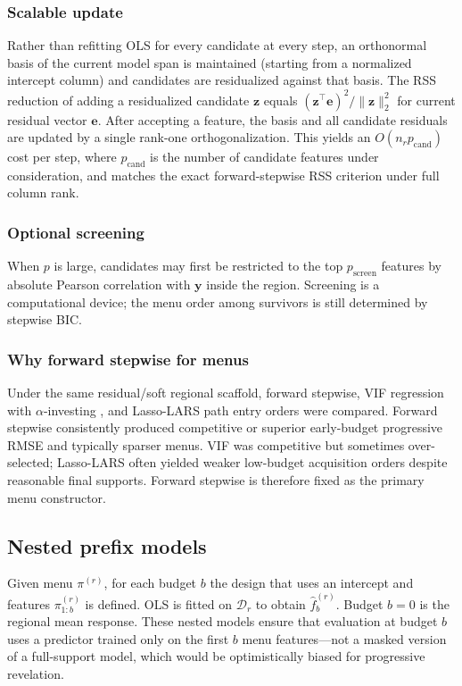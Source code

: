 \documentclass[pdflatex,sn-basic,Numbered]{sn-jnl}
\begin{document}
\subsubsection{Scalable update}
Rather than refitting OLS for every candidate at every step, an orthonormal basis of the current model span is maintained (starting from a normalized intercept column) and candidates are residualized against that basis. The RSS reduction of adding a residualized candidate \(\mathbf{z}\) equals \((\mathbf{z}^\top \mathbf{e})^2/\|\mathbf{z}\|_2^2\) for current residual vector \(\mathbf{e}\). After accepting a feature, the basis and all candidate residuals are updated by a single rank-one orthogonalization. This yields an \(O(n_r p_{\mathrm{cand}})\) cost per step, where \(p_{\mathrm{cand}}\) is the number of candidate features under consideration, and matches the exact forward-stepwise RSS criterion under full column rank.

\subsubsection{Optional screening}
When \(p\) is large, candidates may first be restricted to the top \(p_{\mathrm{screen}}\) features by absolute Pearson correlation with \(\mathbf{y}\) inside the region. Screening is a computational device; the menu order among survivors is still determined by stepwise BIC.

\subsubsection{Why forward stepwise for menus}
Under the same residual/soft regional scaffold, forward stepwise, VIF regression with \(\alpha\)-investing \cite{lin2011}, and Lasso-LARS path entry orders \cite{efron2004} were compared. Forward stepwise consistently produced competitive or superior early-budget progressive RMSE and typically sparser menus. VIF was competitive but sometimes over-selected; Lasso-LARS often yielded weaker low-budget acquisition orders despite reasonable final supports. Forward stepwise is therefore fixed as the primary menu constructor.

\subsection{Nested prefix models}

Given menu \(\pi^{(r)}\), for each budget \(b\) the design that uses an intercept and features \(\pi^{(r)}_{1:b}\) is defined. OLS is fitted on \(\mathcal{D}_r\) to obtain \(\hat f^{(r)}_b\). Budget \(b=0\) is the regional mean response. These nested models ensure that evaluation at budget \(b\) uses a predictor trained only on the first \(b\) menu features---not a masked version of a full-support model, which would be optimistically biased for progressive revelation.
\end{document}
